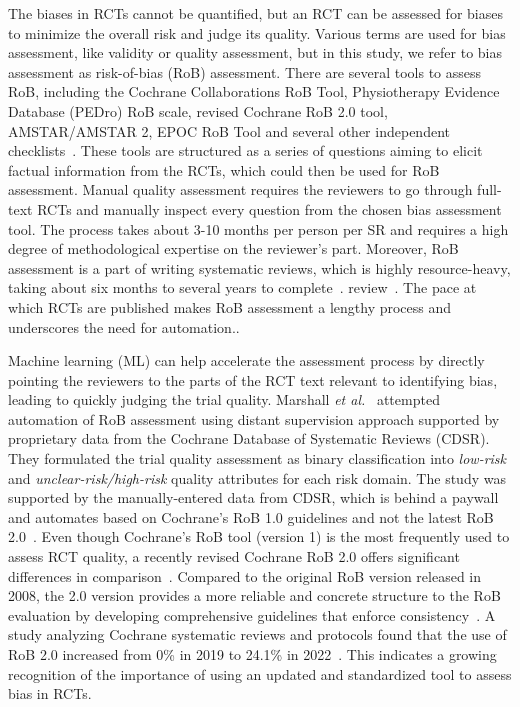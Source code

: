 \documentclass[sn-mathphys,Numbered]{sn-jnl}%
\theoremstyle{thmstyleone}%
\theoremstyle{thmstyletwo}%
\theoremstyle{thmstylethree}%
\begin{document}
The biases in RCTs cannot be quantified, but an RCT can be assessed for biases to minimize the overall risk and judge its quality.
Various terms are used for bias assessment, like validity or quality assessment, but in this study, we refer to bias assessment as risk-of-bias (RoB) assessment.
There are several tools to assess RoB, including the Cochrane Collaborations RoB Tool, Physiotherapy Evidence Database (PEDro) RoB scale, revised Cochrane RoB 2.0 tool, AMSTAR/AMSTAR 2, EPOC RoB Tool and several other independent checklists~\cite{higgins2011cochrane,elkins2013growth,sterne2019rob,shea2017amstar,farrah2019risk}.
These tools are structured as a series of questions aiming to elicit factual information from the RCTs, which could then be used for RoB assessment.
Manual quality assessment requires the reviewers to go through full-text RCTs and manually inspect every question from the chosen bias assessment tool.
The process takes about 3-10 months per person per SR and requires a high degree of methodological expertise on the reviewer's part.
Moreover, RoB assessment is a part of writing systematic reviews, which is highly resource-heavy, taking about six months to several years to complete~\cite{tsertsvadze2015conduct, khangura2012evidence}.
review~\cite{higgins2019cochrane}.
The pace at which RCTs are published makes RoB assessment a lengthy process and underscores the need for automation..

Machine learning (ML) can help accelerate the assessment process by directly pointing the reviewers to the parts of the RCT text relevant to identifying bias, leading to quickly judging the trial quality.
Marshall \textit{et al.}~\cite{marshall2015automating} attempted automation of RoB assessment using distant supervision approach supported by proprietary data from the Cochrane Database of Systematic Reviews (CDSR). 
They formulated the trial quality assessment as binary classification into \textit{low-risk} and \textit{unclear-risk/high-risk} quality attributes for each risk domain.
The study was supported by the manually-entered data from CDSR, which is behind a paywall and automates based on Cochrane's RoB 1.0 guidelines and not the latest RoB 2.0~\cite{higgins2011cochrane}.
Even though Cochrane's RoB tool (version 1) is the most frequently used to assess RCT quality, a recently revised Cochrane RoB 2.0 offers significant differences in comparison~\cite{ma2020methodological}.
Compared to the original RoB version released in 2008, the 2.0 version provides a more reliable and concrete structure to the RoB evaluation by developing comprehensive guidelines that enforce consistency~\cite{higgins2011cochrane,sterne2019rob}.
A study analyzing Cochrane systematic reviews and protocols found that the use of RoB 2.0 increased from 0\% in 2019 to 24.1\% in 2022~\cite{martimbianco2023most}.
This indicates a growing recognition of the importance of using an updated and standardized tool to assess bias in RCTs.
\end{document}
